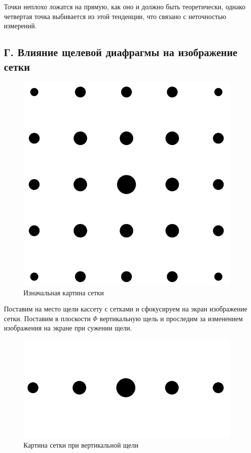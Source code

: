 \documentclass[a4paper,12pt]{article} %
\begin{document}
	Точки неплохо ложатся на прямую, как оно и должно быть теоретически, однако четвертая точка выбивается из этой тенденции, что связано с неточностью измерений.
	
	\newpage
	\subsection*{Г. Влияние щелевой диафрагмы на изображение сетки}
	
	\begin{figure}[h!]
		\centering
		\includegraphics[scale=0.9]{Pictures/Изначальн}
		\caption{Изначальная картина сетки}
	\end{figure}
	
	Поставим на место щели кассету с сетками и сфокусируем на экран изображение сетки. Поставим в плоскости $\Phi$ вертикальную щель и проследим за изменением изображения на экране при сужении щели. 
	
	\begin{figure}[h!]
		\centering
		\includegraphics[scale=0.8]{Pictures/Вертик}
		\caption{Картина сетки при вертикальной щели}
	\end{figure}
	
\end{document}
